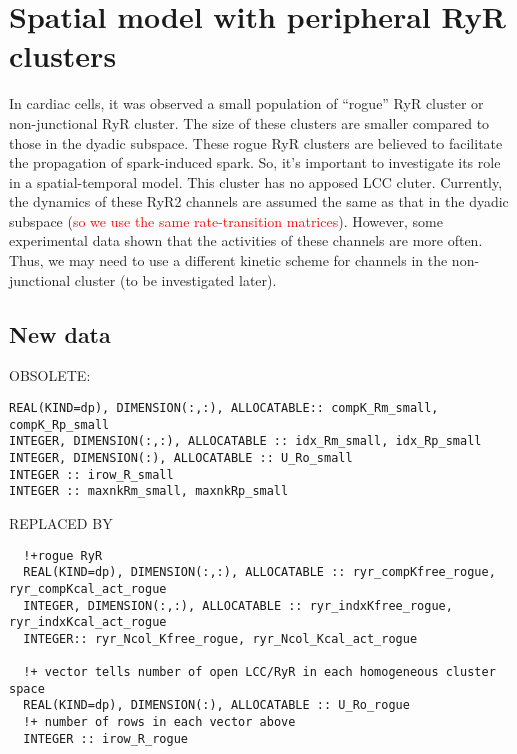 \chapter{Spatial model with peripheral RyR clusters}
\label{chap:small_RyR_cluster}

In cardiac cells, it was observed a small population of ``rogue'' RyR cluster or
non-junctional RyR cluster. The size of these clusters are smaller compared to
those in the dyadic subspace. These rogue RyR clusters are believed to
facilitate the propagation of spark-induced spark. So, it's important to
investigate its role in a spatial-temporal model. This cluster has no apposed
LCC cluter. Currently, the dynamics of these RyR2 channels are assumed the same
as that in the dyadic subspace (\textcolor{red}{so we use the same
rate-transition matrices}). However, some experimental data shown that the
activities of these channels are more often. Thus, we may need to use a
different kinetic scheme for channels in the non-junctional cluster (to be
investigated later).

\section{New data}

OBSOLETE:
\begin{verbatim}
REAL(KIND=dp), DIMENSION(:,:), ALLOCATABLE:: compK_Rm_small, compK_Rp_small
INTEGER, DIMENSION(:,:), ALLOCATABLE :: idx_Rm_small, idx_Rp_small
INTEGER, DIMENSION(:), ALLOCATABLE :: U_Ro_small
INTEGER :: irow_R_small
INTEGER :: maxnkRm_small, maxnkRp_small  
\end{verbatim}
REPLACED BY
\begin{verbatim}
  !+rogue RyR
  REAL(KIND=dp), DIMENSION(:,:), ALLOCATABLE :: ryr_compKfree_rogue, ryr_compKcal_act_rogue
  INTEGER, DIMENSION(:,:), ALLOCATABLE :: ryr_indxKfree_rogue, ryr_indxKcal_act_rogue
  INTEGER:: ryr_Ncol_Kfree_rogue, ryr_Ncol_Kcal_act_rogue

  !+ vector tells number of open LCC/RyR in each homogeneous cluster space
  REAL(KIND=dp), DIMENSION(:), ALLOCATABLE :: U_Ro_rogue
  !+ number of rows in each vector above
  INTEGER :: irow_R_rogue
\end{verbatim}

